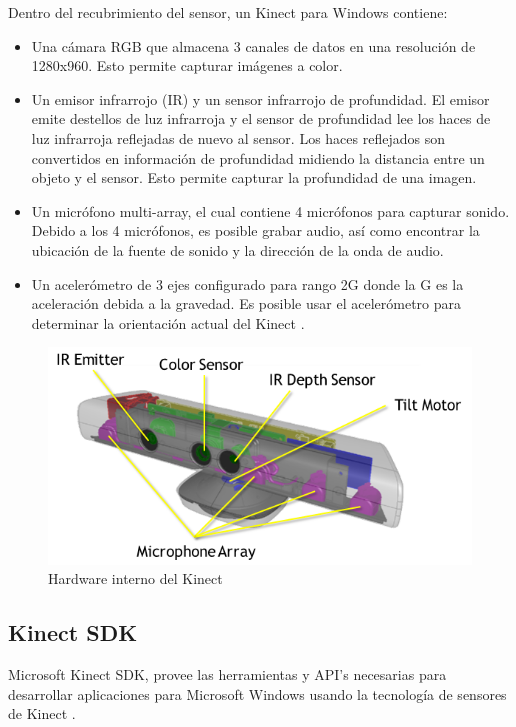 Dentro del recubrimiento del sensor, un Kinect para Windows contiene:

\begin{itemize}
\item Una cámara RGB que almacena 3 canales de datos en una resolución de 1280x960. Esto permite capturar imágenes a color.
\item Un emisor infrarrojo (IR) y un sensor infrarrojo de profundidad. El emisor emite destellos de luz infrarroja y el sensor de profundidad lee los haces de luz infrarroja reflejadas de nuevo al sensor. Los haces reflejados son convertidos en información de profundidad midiendo la distancia entre un objeto y el sensor. Esto permite capturar la profundidad de una imagen.
\item Un micrófono multi-array, el cual contiene 4 micrófonos para capturar sonido. Debido a los 4 micrófonos, es posible grabar audio, así como encontrar la ubicación de la fuente de sonido y la dirección de la onda de audio.
\item Un acelerómetro de 3 ejes configurado para rango 2G donde la G es la aceleración debida a la gravedad. Es posible usar el acelerómetro para determinar la orientación actual del Kinect \cite{Microsoft3}.
\end{itemize}

\begin{figure}[h]%
	\begin{center}
		\includegraphics[scale=1]{./Figuras/KinectHardware}
	\end{center}
	\caption{Hardware interno del Kinect}
	\label{fig:KinectHardware}
\end{figure}
\subsection{Kinect SDK}
Microsoft Kinect SDK, provee las herramientas y API's necesarias para desarrollar aplicaciones para Microsoft Windows usando la tecnología de sensores de Kinect \cite{MicrosoftSDK}.\\

